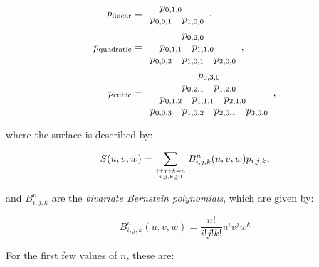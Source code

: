 \begin{align}
p_{\mathrm{linear}} &= \begin{array}{cccc}
& \multicolumn{2}{c}{p_{0,1,0}} & \\
\multicolumn{2}{c}{p_{0,0,1}} & \multicolumn{2}{c}{p_{1,0,0}}
\end{array},\\
p_{\mathrm{quadratic}} &= \begin{array}{cccccc}
\multicolumn{6}{c}{p_{0,2,0}} \\
& \multicolumn{2}{c}{p_{0,1,1}} & \multicolumn{2}{c}{p_{1,1,0}} & \\
\multicolumn{2}{c}{p_{0,0,2}} & \multicolumn{2}{c}{p_{1,0,1}} & \multicolumn{2}{c}{p_{2,0,0}}
\end{array},\\
p_{\mathrm{cubic}} &= \begin{array}{cccccccc}
\multicolumn{8}{c}{p_{0,3,0}} \\
&& \multicolumn{2}{c}{p_{0,2,1}} & \multicolumn{2}{c}{p_{1,2,0}} && \\
& \multicolumn{2}{c}{p_{0,1,2}} & \multicolumn{2}{c}{p_{1,1,1}} & \multicolumn{2}{c}{p_{2,1,0}} & \\
\multicolumn{2}{c}{p_{0,0,3}} & \multicolumn{2}{c}{p_{1,0,2}} & \multicolumn{2}{c}{p_{2,0,1}} & \multicolumn{2}{c}{p_{3,0,0}}
\end{array},
\end{align}

where the surface is described by:

\begin{equation}
S(u,v,w) = \sum_{i+j+k=n \atop i,j,k \geq 0} B^n_{i,j,k}(u,v,w) p_{i,j,k},
\end{equation}

and \(B^n_{i,j,k}\) are the \emph{bivariate Bernstein polynomials}, which are given by:

\begin{equation}
B^n_{i,j,k}(u,v,w) = \frac{n!}{i!j!k!}u^i v^j w^k
\end{equation}

For the first few values of \(n\), these are:


